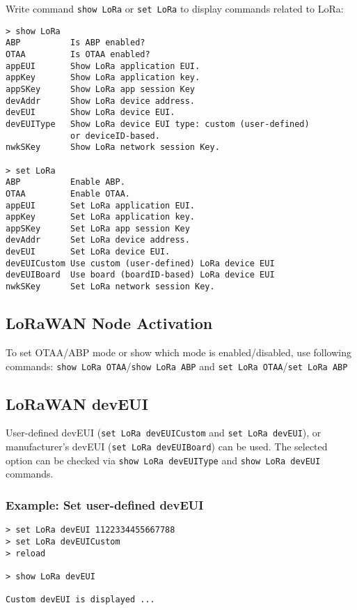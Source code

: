 \documentclass[twoside,a4paper]{refart}
\begin{document}
Write command {\tt show LoRa} or {\tt set LoRa} to display commands related to LoRa:

\begin{Verbatim}[frame=single, fontsize=\small]
> show LoRa
ABP          Is ABP enabled?
OTAA         Is OTAA enabled?
appEUI       Show LoRa application EUI.
appKey       Show LoRa application key.
appSKey      Show LoRa app session Key
devAddr      Show LoRa device address.
devEUI       Show LoRa device EUI.
devEUIType   Show LoRa device EUI type: custom (user-defined) 
             or deviceID-based.
nwkSKey      Show LoRa network session Key.

> set LoRa
ABP          Enable ABP.
OTAA         Enable OTAA.
appEUI       Set LoRa application EUI.
appKey       Set LoRa application key.
appSKey      Set LoRa app session Key
devAddr      Set LoRa device address.
devEUI       Set LoRa device EUI.
devEUICustom Use custom (user-defined) LoRa device EUI
devEUIBoard  Use board (boardID-based) LoRa device EUI
nwkSKey      Set LoRa network session Key.
\end{Verbatim}

\subsection{LoRaWAN Node Activation}
To set OTAA/ABP mode or show which mode is enabled/disabled, use following commands: {\tt show LoRa OTAA}/{\tt show LoRa ABP} and {\tt set LoRa OTAA}/{\tt set LoRa ABP}

\subsection{LoRaWAN devEUI}
User-defined devEUI ({\tt set LoRa devEUICustom} and {\tt set LoRa devEUI}), or manufacturer's devEUI ({\tt set LoRa devEUIBoard}) can be used. The selected option can be checked via {\tt show LoRa devEUIType} and {\tt show LoRa devEUI} commands.

\subsubsection*{Example: Set user-defined devEUI}
\begin{Verbatim}[frame=single, fontsize=\small]
> set LoRa devEUI 1122334455667788
> set LoRa devEUICustom
> reload

> show LoRa devEUI

Custom devEUI is displayed ...

\end{Verbatim}
\end{document}
